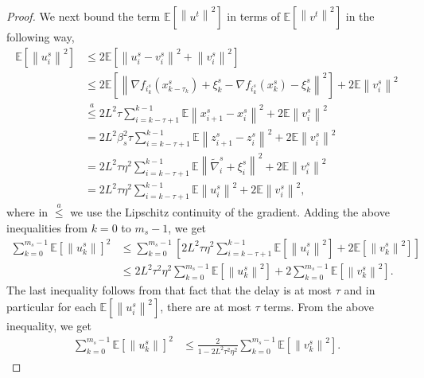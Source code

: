 \documentclass[10pt, conference, compsocconf]{IEEEtran}
\newcommand*{\E}{\mathbb{E}}
\newcommand{\norm}[1]{\left\lVert#1\right\rVert}
\theoremstyle{definition}
\theoremstyle{remark}
\begin{document}
\begin{proof}
We next bound the term $\E[\norm{u^t}^2]$ in terms of $\E[\norm{v^t}^2]$ in the following way,
\begin{equation}
\begin{split}
\E[\norm{u^s_i}^2] &\leq 2\E[\norm{u^s_i-v^s_i}^2+\norm{v^s_i}^2]\\
&\leq 2\E\left[\norm{ \nabla f_{i_k^s}(x_{k-\tau_k}^s)+{\xi}_{k}^s - \nabla f_{i_k^s}(x_{k}^s)-{\xi}_{k}^s}^2\right] + 2\E\norm{v^s_i}^2\\
&\stackrel{a}{\leq} 2 {L}^2\tau \sum_{i=k-\tau+1}^{k-1}\E\norm{x_{i+1}^s-x_{i}^s}^2+ 2\E\norm{v^s_i}^2\\
&= 2 {L}^2\beta_s^2\tau \sum_{i=k-\tau+1}^{k-1}\E\norm{z_{i+1}^s-z_{i}^s}^2+ 2\E\norm{v^s_i}^2\\
&= 2 {L}^2\tau \eta^2\sum_{i=k-\tau+1}^{k-1} \E\norm{\widetilde{\nabla}_{i}^s+\xi_{i}^s}^2+ 2\E\norm{v^s_i}^2\\
&= 2 {L}^2\tau \eta^2\sum_{i=k-\tau+1}^{k-1} \E\norm{u^s_i}^2+ 2\E\norm{v^s_i}^2,
\end{split}
\end{equation}
where in $\stackrel{a}{\leq}$ we use the Lipschitz
continuity of the gradient. 
Adding the above inequalities
from $k=0$ to $m_s-1$, we get
\begin{equation}
\begin{split}
\sum_{k=0}^{m_s-1}\E[\norm{u^s_k}]^2&\leq \sum_{k=0}^{m_s-1}\left[2L^2 \tau\eta^2\sum_{i=k-\tau+1}^{k-1} \E[\norm{u^s_i}^2]+2\E[\norm{v^s_k}^2]\right]\\
&\leq 2L^2 \tau^2\eta^2\sum_{k=0}^{m_s-1}\E[\norm{u^s_k}^2]+2\sum_{k=0}^{m_s-1}\E[\norm{v^s_k}^2].
\end{split}
\end{equation}
The last inequality follows from that fact that the delay is at most $\tau$ and in particular for each  $\E[\norm{u^s_i}^2]$, there are at most $\tau$ terms. From the above inequality, we get 
\begin{equation}\label{Eq6-Lemma1}
\begin{split}
\sum_{k=0}^{m_s-1} \E[\norm{u^s_k}]^2&\leq \frac{2}{1-2L^2 \tau^2\eta^2}\sum_{k=0}^{m_s-1}\E[\norm{v^s_k}^2].
\end{split}
\end{equation}



\end{proof}
\end{document}
